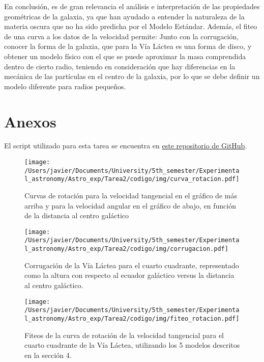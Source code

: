 \documentclass[letterpaper,oneside]{article}
\begin{document}
En conclusión, es de gran relevancia el análisis e interpretación de las propiedades geométricas de la galaxia, ya que han ayudado a entender la naturaleza de la materia oscura que no ha sido predicha por el Modelo Estándar. Además, el fiteo de una curva a los datos de la velocidad permite: Junto con la corrugación, conocer la forma de la galaxia, que para la Vía Láctea es una forma de disco, y obtener un modelo físico con el que se puede aproximar la masa comprendida dentro de cierto radio, teniendo en consideración que hay diferencias en la mecánica de las partículas en el centro de la galaxia, por lo que se debe definir un modelo diferente para radios pequeños.


\section{Anexos}
El script utilizado para esta tarea se encuentra en \href{https://github.com/Wenupi/Astro_exp}{este repositorio de GitHub}.



\begin{figure}[H]
    \centering
    \texttt{[image: /Users/javier/Documents/University/5th\_semester/Experimental\_astronomy/Astro\_exp/Tarea2/codigo/img/curva\_rotacion.pdf]}
    \caption{Curvas de rotación para la velocidad tangencial en el gráfico de más arriba y para la velocidad angular en el gráfico de abajo, en función de la distancia al centro galáctico}
    \label{fig:curva-rotacion}
\end{figure}

\begin{figure}[H]
    \centering
    \texttt{[image: /Users/javier/Documents/University/5th\_semester/Experimental\_astronomy/Astro\_exp/Tarea2/codigo/img/corrugacion.pdf]}
    \caption{Corrugación de la Vía Láctea para el cuarto cuadrante, representado como la altura con respecto al ecuador galáctico versus la distancia al centro galáctico.}
    \label{fig:corrugacion}
\end{figure}

\begin{figure}[H]
    \centering
    \texttt{[image: /Users/javier/Documents/University/5th\_semester/Experimental\_astronomy/Astro\_exp/Tarea2/codigo/img/fiteo\_rotacion.pdf]}
    \caption{Fiteos de la curva de rotación de la velocidad tangencial para el cuarto cuadrante de la Vía Láctea, utilizando los 5 modelos descritos en la sección 4.}
    \label{fig:fit-curva-rotacion}
\end{figure}



\end{document}
